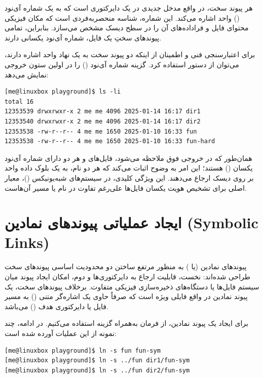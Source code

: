 هر پیوند سخت، در واقع مدخل جدیدی در یک دایرکتوری است که به یک شماره آی‌نود () واحد اشاره می‌کند. این شماره، شناسه منحصربه‌فردی است که مکان فیزیکی محتوای فایل و فراداده‌های آن را در سطح دیسک مشخص می‌سازد. بنابراین، تمامی پیوندهای سختِ یک فایل، شماره آی‌نود یکسانی دارند.

برای اعتبارسنجی فنی و اطمینان از اینکه دو پیوند سخت به یک نهاد واحد اشاره دارند، می‌توان از دستور  استفاده کرد. گزینه  شماره آی‌نود () را در اولین ستون خروجی نمایش می‌دهد:

\begin{latin}
\begin{lstlisting}
[me@linuxbox playground]$ ls -li
total 16
12353539 drwxrwxr-x 2 me me 4096 2025-01-14 16:17 dir1
12353540 drwxrwxr-x 2 me me 4096 2025-01-14 16:17 dir2
12353538 -rw-r--r-- 4 me me 1650 2025-01-10 16:33 fun
12353538 -rw-r--r-- 4 me me 1650 2025-01-10 16:33 fun-hard
\end{lstlisting}
\end{latin}

همان‌طور که در خروجی فوق ملاحظه می‌شود، فایل‌های  و  هر دو دارای شماره آی‌نود یکسان () هستند؛ این امر به وضوح اثبات می‌کند که هر دو نام، به یک بلوک داده واحد بر روی دیسک ارجاع می‌دهند. این ویژگی کلیدی، در سیستم‌های شبه‌یونیکس ()، معیار اصلی برای تشخیص هویت یکسان فایل‌ها علی‌رغم تفاوت در نام یا مسیر آن‌هاست.

\section{ایجاد عملیاتی پیوندهای نمادین (Symbolic Links)}

پیوندهای نمادین (یا ) به منظور مرتفع ساختن دو محدودیت اساسی پیوندهای سخت طراحی شده‌اند: نخست، قابلیت ارجاع به دایرکتوری‌ها و دوم، امکان ایجاد پیوند میان سیستم‌ فایل‌ها یا دستگاه‌های ذخیره‌سازی فیزیکی متفاوت. برخلاف پیوندهای سخت، یک پیوند نمادین در واقع فایلی ویژه است که صرفاً حاوی یک اشاره‌گر متنی () به مسیر فایل یا دایرکتوری هدف () می‌باشد.

برای ایجاد یک پیوند نمادین، از فرمان  به‌همراه گزینه  استفاده می‌کنیم. در ادامه، چند نمونه از این عملیات آورده شده است:

\begin{latin}
\begin{lstlisting}
[me@linuxbox playground]$ ln -s fun fun-sym
[me@linuxbox playground]$ ln -s ../fun dir1/fun-sym
[me@linuxbox playground]$ ln -s ../fun dir2/fun-sym
\end{lstlisting}
\end{latin}

